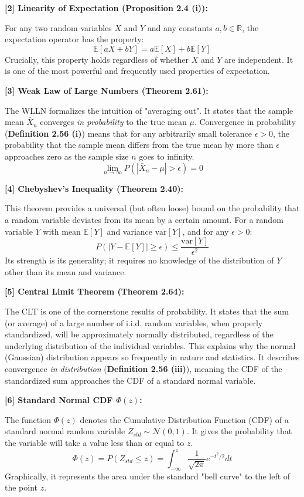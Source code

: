 \documentclass[11pt,a4paper]{article}
\begin{document}
\hypertarget{note2}{\textbf{[2] Linearity of Expectation (Proposition 2.4 (i)):}}
For any two random variables $X$ and $Y$ and any constants $a, b \in \mathbb{R}$, the expectation operator has the property:
\[ \mathbb{E}[aX + bY] = a\mathbb{E}[X] + b\mathbb{E}[Y] \]
Crucially, this property holds regardless of whether $X$ and $Y$ are independent. It is one of the most powerful and frequently used properties of expectation.

\hypertarget{note3}{\textbf{[3] Weak Law of Large Numbers (Theorem 2.61):}}
The WLLN formalizes the intuition of "averaging out". It states that the sample mean $\bar{X}_n$ converges \textit{in probability} to the true mean $\mu$.
Convergence in probability (\textbf{Definition 2.56 (i)}) means that for any arbitrarily small tolerance $\epsilon > 0$, the probability that the sample mean differs from the true mean by more than $\epsilon$ approaches zero as the sample size $n$ goes to infinity.
\[ \lim_{n \to \infty} P(|\bar{X}_n - \mu| > \epsilon) = 0 \]

\hypertarget{note4}{\textbf{[4] Chebyshev's Inequality (Theorem 2.40):}}
This theorem provides a universal (but often loose) bound on the probability that a random variable deviates from its mean by a certain amount. For a random variable $Y$ with mean $\mathbb{E}[Y]$ and variance $\text{var}[Y]$, and for any $\epsilon > 0$:
\[ P(|Y - \mathbb{E}[Y]| \ge \epsilon) \le \frac{\text{var}[Y]}{\epsilon^2} \]
Its strength is its generality; it requires no knowledge of the distribution of $Y$ other than its mean and variance.

\hypertarget{note5}{\textbf{[5] Central Limit Theorem (Theorem 2.64):}}
The CLT is one of the cornerstone results of probability. It states that the sum (or average) of a large number of i.i.d. random variables, when properly standardized, will be approximately normally distributed, regardless of the underlying distribution of the individual variables. This explains why the normal (Gaussian) distribution appears so frequently in nature and statistics. It describes convergence \textit{in distribution} (\textbf{Definition 2.56 (iii)}), meaning the CDF of the standardized sum approaches the CDF of a standard normal variable.

\hypertarget{note6}{\textbf{[6] Standard Normal CDF $\Phi(z)$:}}
The function $\Phi(z)$ denotes the Cumulative Distribution Function (CDF) of a standard normal random variable $Z_{std} \sim \mathcal{N}(0, 1)$. It gives the probability that the variable will take a value less than or equal to $z$.
\[ \Phi(z) = P(Z_{std} \le z) = \int_{-\infty}^{z} \frac{1}{\sqrt{2\pi}} e^{-t^2/2} dt \]
Graphically, it represents the area under the standard "bell curve" to the left of the point $z$.
\end{document}
